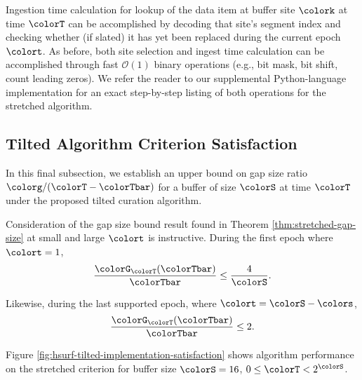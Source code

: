 Ingestion time calculation for lookup of the data item at buffer site $\colork$ at time $\colorT$ can be accomplished by decoding that site's segment index and checking whether (if slated) it has yet been replaced during the current epoch $\colort$.
As before, both site selection and ingest time calculation can be accomplished through fast $\mathcal{O}(1)$ binary operations (e.g., bit mask, bit shift, count leading zeros).
We refer the reader to our supplemental Python-language implementation for an exact step-by-step listing of both operations for the stretched algorithm.

\subsection{Tilted Algorithm Criterion Satisfaction}
\label{sec:tilted-satisfaction}

In this final subsection, we establish an upper bound on gap size ratio $\colorg/(\colorT - \colorTbar)$ for a buffer of size $\colorS$ at time $\colorT$ under the proposed tilted curation algorithm.



Consideration of the gap size bound result found in Theorem \ref{thm:stretched-gap-size} at small and large $\colort$ is instructive.
During the first epoch where $\colort = 1$,
\begin{align*}
\frac{\colorG_{\colorT}(\colorTbar)}{\colorTbar}
\leq
\frac{4}{\colorS}.
\end{align*}

Likewise, during the last supported epoch, where $\colort = \colorS - \colors$,
\begin{align*}
\frac{\colorG_{\colorT}(\colorTbar)}{\colorTbar}
\leq
2.
\end{align*}

Figure \ref{fig:hsurf-tilted-implementation-satisfaction} shows algorithm performance on the stretched criterion for buffer size $\colorS=16$, $0 \leq \colorT < 2^{\colorS}$.
